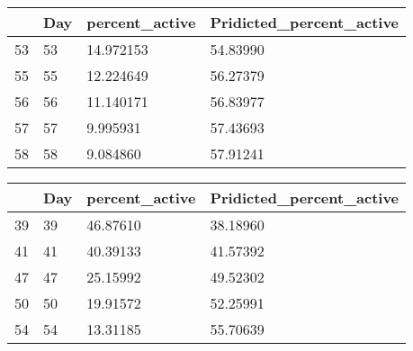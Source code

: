 \documentclass[11pt]{article}
\begin{document}
    \begin{tabular}{r|lll}
  & Day & percent\_active & Pridicted\_percent\_active\\
\hline
	53 & 53        & 14.972153 & 54.83990 \\
	55 & 55        & 12.224649 & 56.27379 \\
	56 & 56        & 11.140171 & 56.83977 \\
	57 & 57        &  9.995931 & 57.43693 \\
	58 & 58        &  9.084860 & 57.91241 \\
\end{tabular}


    
    \begin{tabular}{r|lll}
  & Day & percent\_active & Pridicted\_percent\_active\\
\hline
	39 & 39       & 46.87610 & 38.18960\\
	41 & 41       & 40.39133 & 41.57392\\
	47 & 47       & 25.15992 & 49.52302\\
	50 & 50       & 19.91572 & 52.25991\\
	54 & 54       & 13.31185 & 55.70639\\
\end{tabular}
\end{document}
